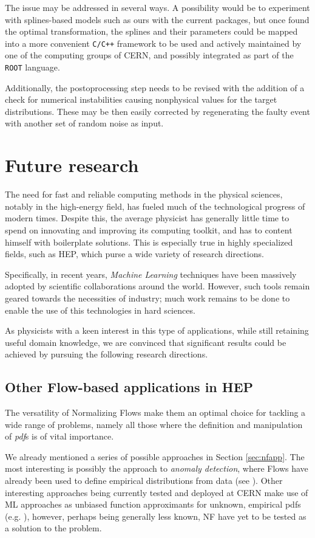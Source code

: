 The issue may be addressed in several ways. A possibility would be to experiment with splines-based models such as ours with the current packages, but once found the optimal transformation, the splines and their parameters could be mapped into a more convenient \texttt{C/C++} framework to be used and actively maintained by one of the computing groups of CERN, and possibly integrated as part of the \texttt{ROOT} language.

Additionally, the postoprocessing step needs to be revised with the addition of a check for numerical instabilities causing nonphysical values for the target distributions. These may be then easily corrected by regenerating the faulty event with another set of random noise as input.

\section{Future research}
The need for fast and reliable computing methods in the physical sciences, notably in the high-energy field, has fueled much of the technological progress of modern times. Despite this, the average physicist has generally little time to spend on innovating and improving its computing toolkit, and has to content himself with boilerplate solutions. This is especially true in highly specialized fields, such as HEP, which purse a wide variety of research directions.

Specifically, in recent years, \emph{Machine Learning} techniques have been massively adopted by scientific collaborations around the world. However, such tools remain geared towards the necessities of industry; much work remains to be done to enable the use of this technologies in hard sciences.

As physicists with a keen interest in this type of applications, while still retaining useful domain knowledge, we are convinced that significant results could be achieved by pursuing the following research directions. 

\subsection{Other Flow-based applications in HEP}

The versatility of Normalizing Flows make them an optimal choice for tackling a wide range of problems, namely all those where the definition and manipulation of \emph{pdf}s is of vital importance.

We already mentioned a series of possible approaches in Section \ref{sec:nfapp}. The most interesting is possibly the approach to \emph{anomaly detection}, where Flows have already been used to define empirical distributions from data (see \cite{Kasieczka_2021}). Other interesting approaches being currently tested and deployed at CERN make use of ML approaches as unbiased function approximants for unknown, empirical pdfs (e.g. \cite{D_Agnolo_2019}), however, perhaps being generally less known, NF have yet to be tested as a solution to the problem.

